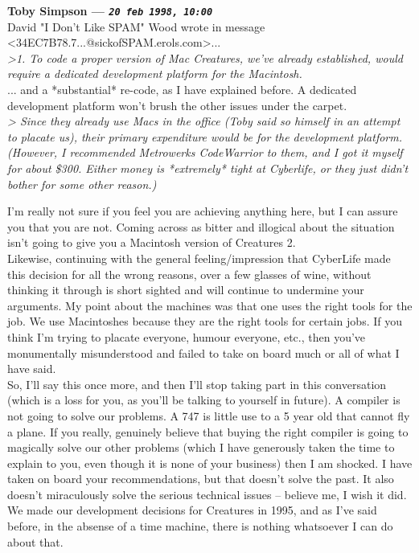 \documentclass[11pt,twoside,a4paper]{article}
\begin{document}
\begin{multicols*}{2}
	
		
\textbf{Toby Simpson --- \emph{\texttt{20 feb 1998, 10:00}}}~\\

David "I Don't Like SPAM" Wood wrote in message <34EC7B78.7...@sickofSPAM.erols.com>...~\\
\emph{>1. To code a proper version of Mac Creatures, we've already established, would require a dedicated development platform for the Macintosh.}~\\

... and a *substantial* re-code, as I have explained before. A dedicated development platform won't brush the other issues under the carpet.~\\

\emph{> Since they already use Macs in the office (Toby said so himself in an attempt to placate us), their primary expenditure would be for the development platform. (However, I recommended Metrowerks CodeWarrior to them, and I got it myself for about \$300. Either money is *extremely* tight at Cyberlife, or they just didn't bother for some other reason.)}

I'm really not sure if you feel you are achieving anything here, but I can assure you that you are not. Coming across as bitter and illogical about the situation isn't going to give you a Macintosh version of Creatures 2. ~\\
Likewise, continuing with the general feeling/impression that CyberLife made this decision for all the wrong reasons, over a few glasses of wine, without thinking it through is short sighted and will continue to undermine your arguments. My point about the machines was that one uses the right tools for the job. We use Macintoshes because they are the right tools for certain jobs. If you think I'm trying to placate everyone, humour everyone, etc., then you've monumentally misunderstood and failed to take on board much or all of what I have said.~\\

So, I'll say this once more, and then I'll stop taking part in this conversation (which is a loss for you, as you'll be talking to yourself in future). A compiler is not going to solve our problems. A 747 is little use to a 5 year old that cannot fly a plane. If you really, genuinely believe that buying the right compiler is going to magically solve our other problems (which I have generously taken the time to explain to you, even though it is none of your business) then I am shocked. I have taken on board your recommendations, but that doesn't solve the past. It also doesn't miraculously solve the serious technical issues -- believe me, I wish it did. We made our development decisions for Creatures in 1995, and as I've said before, in the absense of a time machine, there is nothing whatsoever I can do about that.~\\


\end{multicols*}
\end{document}

